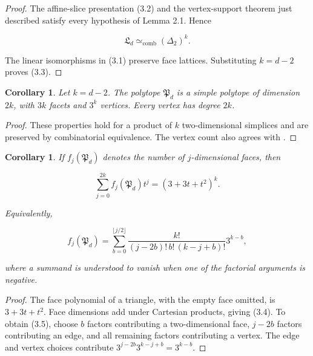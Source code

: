 \documentclass[11pt]{article}
\newtheorem{corollary}[theorem]{Corollary}
\theoremstyle{remark}
\numberwithin{equation}{section}
\begin{document}
\begin{proof}

The affine-slice presentation (3.2) and the vertex-support theorem just
described satisfy every hypothesis of Lemma 2.1. Hence

\nopagebreak[4]
\[
\mathfrak L_d\simeq_{\mathrm{comb}}(\Delta_2)^k.
\]

The linear isomorphisms in (3.1) preserve face lattices. Substituting
$k=d-2$ proves (3.3).
\end{proof}


\Needspace{0.32\textheight}
\begin{corollary}

Let $k=d-2$. The polytope $\mathfrak P_d$ is a simple polytope of dimension
$2k$, with $3k$ facets and $3^k$ vertices. Every vertex has degree $2k$.

\end{corollary}

\begin{proof}

These properties hold for a product of $k$ two-dimensional simplices and are
preserved by combinatorial equivalence. The vertex count also agrees with
\cite[Theorem 5.20]{couvee2026}.
\end{proof}


\Needspace{0.32\textheight}
\begin{corollary}

If $f_j(\mathfrak P_d)$ denotes the number of $j$-dimensional faces, then

\nopagebreak[4]
\[
\sum_{j=0}^{2k}f_j(\mathfrak P_d)t^j
=(3+3t+t^2)^k.
\tag{3.4}
\]

Equivalently,

\nopagebreak[4]
\[
f_j(\mathfrak P_d)
=\sum_{b=0}^{\lfloor j/2\rfloor}
\frac{k!}{(j-2b)!\,b!\,(k-j+b)!}
3^{k-b},
\tag{3.5}
\]

where a summand is understood to vanish when one of the factorial arguments
is negative.

\end{corollary}

\begin{proof}

The face polynomial of a triangle, with the empty face omitted, is
$3+3t+t^2$. Face dimensions add under Cartesian products, giving (3.4).
To obtain (3.5), choose $b$ factors contributing a two-dimensional face,
$j-2b$ factors contributing an edge, and all remaining factors contributing
a vertex. The edge and vertex choices contribute
$3^{j-2b}3^{k-j+b}=3^{k-b}$.
\end{proof}
\end{document}
